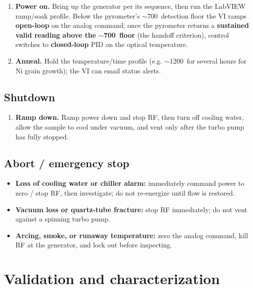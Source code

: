 \documentclass[5p,times]{elsarticle}
\begin{document}
\begin{enumerate}[nosep,start=4]
\item \textbf{Power on.} Bring up the generator per its sequence, then run the LabVIEW
ramp/soak profile. Below the pyrometer's $\sim$700\,\celsius{} detection floor the VI
ramps \textbf{open-loop} on the analog command; once the pyrometer returns a
\textbf{sustained valid reading above the $\sim$700\,\celsius{} floor} (the handoff
criterion), control switches to \textbf{closed-loop} PID on the optical temperature.
\item \textbf{Anneal.} Hold the temperature/time profile (e.g. $\sim$1200\,\celsius{}
for several hours for Ni grain growth); the VI can email status alerts.
\end{enumerate}

\subsection{Shutdown}

\begin{enumerate}[nosep,start=6]
\item \textbf{Ramp down.} Ramp power down and stop RF, then turn off cooling water,
allow the sample to cool under vacuum, and vent only after the turbo pump has fully
stopped.
\end{enumerate}

\subsection{Abort / emergency stop}

\begin{itemize}[nosep]
\item \textbf{Loss of cooling water or chiller alarm:} immediately command power to zero / stop RF, then investigate; do not re-energize until flow is restored.
\item \textbf{Vacuum loss or quartz-tube fracture:} stop RF immediately; do not vent against a spinning turbo pump.
\item \textbf{Arcing, smoke, or runaway temperature:} zero the analog command, kill RF at the generator, and lock out before inspecting.
\end{itemize}

\section{Validation and characterization}
\end{document}
